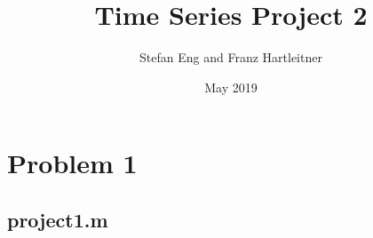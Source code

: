 \documentclass{article}
\title{Time Series Project 2}
\author{Stefan Eng and Franz Hartleitner}
\date{May 2019}
\begin{document}
\maketitle

\section*{Problem 1}

\begin{appendices}

\subsection{project1.m}


\end{appendices}

%
%
\end{document}
